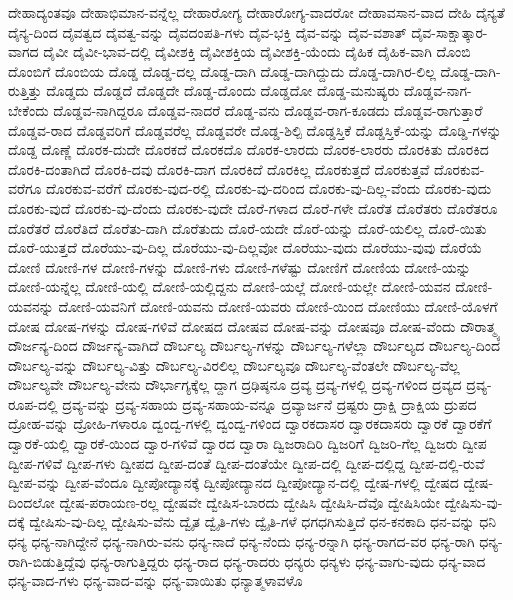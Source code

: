 {ದೇಹಾದ್ಯಂತವೂ
ದೇಹಾಭಿಮಾನ-ವನ್ನೆಲ್ಲ
ದೇಹಾರೋಗ್ಯ
ದೇಹಾರೋಗ್ಯ-ವಾದರೋ
ದೇಹಾವಸಾನ-ವಾದ
ದೇಹಿ
ದೈನ್ಯತೆ
ದೈನ್ಯ-ದಿಂದ
ದೈವತ್ವದ
ದೈವತ್ವ-ವನ್ನು
ದೈವದಂಪತಿ-ಗಳು
ದೈವ-ಭಕ್ತಿ
ದೈವ-ವನ್ನು
ದೈವ-ವಶಾತ್
ದೈವ-ಸಾಕ್ಷಾತ್ಕಾರ-ವಾಗದ
ದೈವೀ
ದೈವೀ-ಭಾವ-ದಲ್ಲಿ
ದೈವೀಶಕ್ತಿ
ದೈವೀಶಕ್ತಿಯ
ದೈವೀಶಕ್ತಿ-ಯೆಂದು
ದೈಹಿಕ
ದೈಹಿಕ-ವಾಗಿ
ದೊಂಬಿ
ದೊಂಬಿಗೆ
ದೊಂಬಿಯ
ದೊಡ್ಡ
ದೊಡ್ಡ-ದಲ್ಲ
ದೊಡ್ಡ-ದಾಗಿ
ದೊಡ್ಡ-ದಾಗಿದ್ದುದು
ದೊಡ್ಡ-ದಾಗಿರ-ಲಿಲ್ಲ
ದೊಡ್ಡ-ದಾಗಿ-ರುತ್ತಿತ್ತು
ದೊಡ್ಡದು
ದೊಡ್ಡದೆ
ದೊಡ್ಡದೇ
ದೊಡ್ಡ-ದೊಂದು
ದೊಡ್ಡದೋ
ದೊಡ್ಡ-ಮನುಷ್ಯರು
ದೊಡ್ಡವ-ನಾಗ-ಬೇಕೆಂದು
ದೊಡ್ಡವ-ನಾಗಿದ್ದರೂ
ದೊಡ್ಡವ-ನಾದರೆ
ದೊಡ್ಡ-ವನು
ದೊಡ್ಡವ-ರಾಗ-ಕೂಡದು
ದೊಡ್ಡವ-ರಾಗುತ್ತಾರೆ
ದೊಡ್ಡವ-ರಾದ
ದೊಡ್ಡವರಿಗೆ
ದೊಡ್ಡವರೆಲ್ಲ
ದೊಡ್ಡವರೇ
ದೊಡ್ಡ-ಶಿಲ್ಪಿ
ದೊಡ್ಡಸ್ತಿಕೆ
ದೊಡ್ಡಸ್ತಿಕೆ-ಯನ್ನು
ದೊಡ್ಡಿ-ಗಳನ್ನು
ದೊಡ್ದ
ದೊಣ್ಣೆ
ದೊರಕ-ದುದೇ
ದೊರಕದೆ
ದೊರಕದೊ
ದೊರಕ-ಲಾರದು
ದೊರಕ-ಲಾರರು
ದೊರಕಿತು
ದೊರಕಿದ
ದೊರಕಿ-ದಂತಾಗಿದೆ
ದೊರಕಿ-ದವು
ದೊರಕಿ-ದಾಗ
ದೊರಕಿದೆ
ದೊರಕಿಲ್ಲ
ದೊರಕುತ್ತದೆ
ದೊರಕುತ್ತವೆ
ದೊರಕುವ-ವರೆಗೂ
ದೊರಕುವ-ವರೆಗೆ
ದೊರಕು-ವುದ-ರಲ್ಲಿ
ದೊರಕು-ವು-ದರಿಂದ
ದೊರಕು-ವು-ದಿಲ್ಲ-ವೆಂದು
ದೊರಕು-ವುದು
ದೊರಕು-ವುದೆ
ದೊರಕು-ವು-ದೆಂದು
ದೊರಕು-ವುದೇ
ದೊರೆ-ಗಳಾದ
ದೊರೆ-ಗಳೇ
ದೊರೆತ
ದೊರೆತರು
ದೊರೆತರೂ
ದೊರೆತರೆ
ದೊರೆತಿದೆ
ದೊರೆತು-ದಾಗಿ
ದೊರೆತುದು
ದೊರೆ-ಯದೇ
ದೊರೆ-ಯನ್ನು
ದೊರೆ-ಯಲಿಲ್ಲ
ದೊರೆ-ಯಿತು
ದೊರೆ-ಯುತ್ತದೆ
ದೊರೆಯು-ವು-ದಿಲ್ಲ
ದೊರೆಯು-ವು-ದಿಲ್ಲವೋ
ದೊರೆಯು-ವುದು
ದೊರೆಯು-ವುವು
ದೊರೆಯೆ
ದೋಣಿ
ದೋಣಿ-ಗಳ
ದೋಣಿ-ಗಳನ್ನು
ದೋಣಿ-ಗಳು
ದೋಣಿ-ಗಳೆಷ್ಟು
ದೋಣಿಗೆ
ದೋಣಿಯ
ದೋಣಿ-ಯನ್ನು
ದೋಣಿ-ಯನ್ನೆಲ್ಲ
ದೋಣಿ-ಯಲ್ಲಿ
ದೋಣಿ-ಯಲ್ಲಿದ್ದನು
ದೋಣಿ-ಯಲ್ಲೆ
ದೋಣಿ-ಯಲ್ಲೇ
ದೋಣಿ-ಯವನ
ದೋಣಿ-ಯವನನ್ನು
ದೋಣಿ-ಯವನಿಗೆ
ದೋಣಿ-ಯವನು
ದೋಣಿ-ಯವರು
ದೋಣಿ-ಯಿಂದ
ದೋಣಿಯು
ದೋಣಿ-ಯೊಳಗೆ
ದೋಷ
ದೋಷ-ಗಳನ್ನು
ದೋಷ-ಗಳಿವೆ
ದೋಷದ
ದೋಷವ
ದೋಷ-ವನ್ನು
ದೋಷವೂ
ದೋಷ-ವೆಂದು
ದೌರಾತ್ಮ್ಯ
ದೌರ್ಜನ್ಯ-ದಿಂದ
ದೌರ್ಜನ್ಯ-ವಾಗಿದೆ
ದೌರ್ಬಲ್ಯ
ದೌರ್ಬಲ್ಯ-ಗಳನ್ನು
ದೌರ್ಬಲ್ಯ-ಗಳೆಲ್ಲಾ
ದೌರ್ಬಲ್ಯದ
ದೌರ್ಬಲ್ಯ-ದಿಂದ
ದೌರ್ಬಲ್ಯ-ವನ್ನು
ದೌರ್ಬಲ್ಯ-ವಿತ್ತು
ದೌರ್ಬಲ್ಯ-ವಿರಲಿಲ್ಲ
ದೌರ್ಬಲ್ಯವೂ
ದೌರ್ಬಲ್ಯ-ವೆಂತಲೇ
ದೌರ್ಬಲ್ಯ-ವೆಲ್ಲ
ದೌರ್ಬಲ್ಯವೇ
ದೌರ್ಬಲ್ಯ-ವೇನು
ದೌರ್ಭಾಗ್ಯಕ್ಕೆಲ್ಲ
ದ್ದಾಗ
ದ್ರಢಿಷ್ಠನೂ
ದ್ರವ್ಯ
ದ್ರವ್ಯ-ಗಳಲ್ಲಿ
ದ್ರವ್ಯ-ಗಳಿಂದ
ದ್ರವ್ಯದ
ದ್ರವ್ಯ-ರೂಪ-ದಲ್ಲಿ
ದ್ರವ್ಯ-ವನ್ನು
ದ್ರವ್ಯ-ಸಹಾಯ
ದ್ರವ್ಯ-ಸಹಾಯ-ವನ್ನೂ
ದ್ರವ್ಯಾರ್ಜನೆ
ದ್ರಷ್ಟರು
ದ್ರಾಕ್ಷಿ
ದ್ರಾಕ್ಷಿಯ
ದ್ರುಪದ
ದ್ರೋಹ-ವನ್ನು
ದ್ರೋಹಿ-ಗಳಾರೂ
ದ್ವಂದ್ವ-ಗಳಲ್ಲಿ
ದ್ವಂದ್ವ-ಗಳಿಂದ
ದ್ವಾರಕದಾಸರ
ದ್ವಾರಕದಾಸರು
ದ್ವಾರಕೆ
ದ್ವಾರಕೆಗೆ
ದ್ವಾರಕೆ-ಯಲ್ಲಿ
ದ್ವಾರಕೆ-ಯಿಂದ
ದ್ವಾರ-ಗಳಿವೆ
ದ್ವಾರದ
ದ್ವಾರಾ
ದ್ವಿಜರಾದಿರಿ
ದ್ವಿಜರಿಗೆ
ದ್ವಿಜರಿ-ಗೆಲ್ಲ
ದ್ವಿಜರು
ದ್ವೀಪ
ದ್ವೀಪ-ಗಳಿವೆ
ದ್ವೀಪ-ಗಳು
ದ್ವೀಪದ
ದ್ವೀಪ-ದಂತೆ
ದ್ವೀಪ-ದಂತೆಯೇ
ದ್ವೀಪ-ದಲ್ಲಿ
ದ್ವೀಪ-ದಲ್ಲಿದ್ದ
ದ್ವೀಪ-ದಲ್ಲಿ-ರುವೆ
ದ್ವೀಪ-ವನ್ನು
ದ್ವೀಪ-ವೆಂದೂ
ದ್ವೀಪೋದ್ಯಾನಕ್ಕೆ
ದ್ವೀಪೋದ್ಯಾನದ
ದ್ವೀಪೋದ್ಯಾನ-ದಲ್ಲಿ
ದ್ವೇಷ-ಗಳಲ್ಲಿ
ದ್ವೇಷದ
ದ್ವೇಷ-ದಿಂದಲೋ
ದ್ವೇಷ-ಪರಾಯಣ-ರಲ್ಲ
ದ್ವೇಷವೇ
ದ್ವೇಷಿಸ-ಬಾರದು
ದ್ವೇಷಿಸಿ
ದ್ವೇಷಿಸಿ-ದೆವೊ
ದ್ವೇಷಿಸಿಯೇ
ದ್ವೇಷಿಸು-ವು-ದಕ್ಕೆ
ದ್ವೇಷಿಸು-ವು-ದಿಲ್ಲ
ದ್ವೇಷಿಸು-ವೆನು
ದ್ವೈತ
ದ್ವೈತಿ-ಗಳು
ದ್ವೈತಿ-ಗಳೆ
ಧಗಧಗಿಸುತ್ತಿದೆ
ಧನ-ಕನಕಾದಿ
ಧನ-ವನ್ನು
ಧನಿ
ಧನ್ಯ
ಧನ್ಯ-ನಾಗಿದ್ದೇನೆ
ಧನ್ಯ-ನಾಗಿರು-ವನು
ಧನ್ಯ-ನಾದೆ
ಧನ್ಯ-ನೆಂದು
ಧನ್ಯ-ರನ್ನಾಗಿ
ಧನ್ಯ-ರಾಗದ-ವರ
ಧನ್ಯ-ರಾಗಿ
ಧನ್ಯ-ರಾಗಿ-ಬಿಡುತ್ತಿದ್ದೆವು
ಧನ್ಯ-ರಾಗುತ್ತಿದ್ದರು
ಧನ್ಯ-ರಾದ
ಧನ್ಯ-ರಾದರು
ಧನ್ಯರು
ಧನ್ಯಳು
ಧನ್ಯ-ವಾಗು-ವುದು
ಧನ್ಯ-ವಾದ
ಧನ್ಯ-ವಾದ-ಗಳು
ಧನ್ಯ-ವಾದ-ವನ್ನು
ಧನ್ಯ-ವಾಯಿತು
ಧನ್ಯಾತ್ಮಳಾವಳೊ
}
